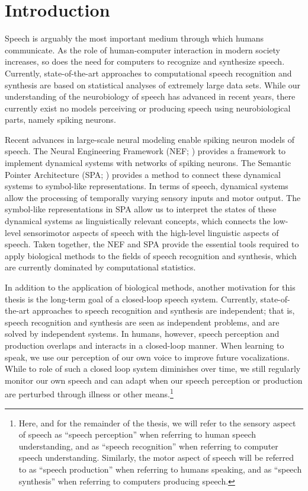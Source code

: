 \chapter{Introduction}

Speech is arguably the most important
medium through which humans communicate.
As the role of human-computer interaction
in modern society increases,
so does the need for computers
to recognize and synthesize speech.
Currently, state-of-the-art approaches
to computational
speech recognition and synthesis
are based on statistical analyses
of extremely large data sets.
While our understanding
of the neurobiology of speech has advanced
in recent years,
there currently exist no
models perceiving or producing speech
using neurobiological parts,
namely spiking neurons.

Recent advances in large-scale neural modeling
enable spiking neuron models of speech.
The Neural Engineering Framework (NEF; \cite{eliasmith2004})
provides a framework to implement
dynamical systems with networks of spiking neurons.
The Semantic Pointer Architecture (SPA; \cite{eliasmith2013})
provides a method to connect these dynamical systems
to symbol-like representations.
In terms of speech,
dynamical systems allow
the processing of
temporally varying sensory inputs and motor output.
The symbol-like representations in SPA
allow us to interpret the states
of these dynamical systems
as linguistically relevant concepts,
which connects the low-level
sensorimotor aspects of speech
with the high-level linguistic aspects of speech.
Taken together, the NEF and SPA
provide the essential tools required
to apply biological methods
to the fields of
speech recognition and synthesis,
which are currently dominated
by computational statistics.

In addition to the application of biological methods,
another motivation for this thesis
is the long-term goal of a closed-loop
speech system.
Currently, state-of-the-art approaches
to speech recognition and synthesis
are independent;
that is, speech recognition and synthesis
are seen as independent problems,
and are solved by independent systems.
In humans, however,
speech perception and production
overlaps and interacts in a closed-loop manner.
When learning to speak,
we use our perception of our own voice
to improve future vocalizations.
While to role of such a closed loop system
diminishes over time,
we still regularly monitor
our own speech and can adapt
when our speech perception or production
are perturbed through illness
or other means.\footnote{
  Here, and for the remainder of the thesis,
  we will refer to the sensory aspect
  of speech as ``speech perception''
  when referring to human speech understanding,
  and as ``speech recognition''
  when referring to computer speech understanding.
  Similarly, the motor aspect of speech
  will be referred to as
  ``speech production''
  when referring to humans speaking,
  and as ``speech synthesis''
  when referring to computers producing speech.}

